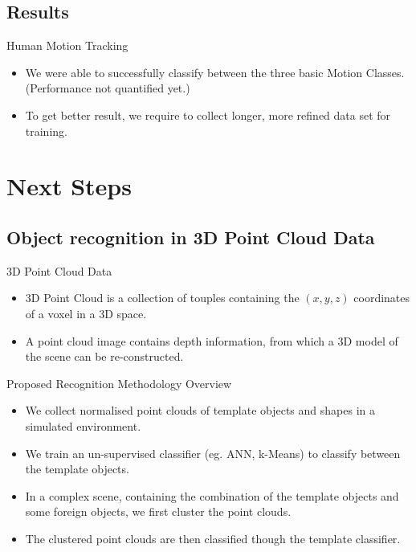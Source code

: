 \documentclass{beamer}
\begin{document}
\subsection{Results}
\begin{frame}{Human Motion Tracking}
    \begin{itemize}
    \item {
      We were able to successfully classify between the three basic Motion Classes. (Performance not quantified yet.)
    }
    \item {
      To get better result, we require to collect longer, more refined data set for training.
    }
    \end{itemize}
\end{frame}

\section{Next Steps}
\subsection{Object recognition in 3D Point Cloud Data}
\begin{frame}{3D Point Cloud Data}
  \begin{itemize}
  \item {
    3D Point Cloud is a collection of touples containing the $(x, y, z)$ coordinates of a voxel in a 3D space.
  }
  \item {
    A point cloud image contains depth information, from which a 3D model of the scene can be re-constructed.
  }
  \end{itemize}
\end{frame}
\begin{frame}{Proposed Recognition Methodology Overview}
  \begin{itemize}
  \item {
    We collect normalised point clouds of template objects and shapes in a simulated environment.
  }
  \item {
    We train an un-supervised classifier (eg. ANN, k-Means) to classify between the template objects.
  }
  \item {
    In a complex scene, containing the combination of the template objects and some foreign objects, we first cluster the point clouds.
  }
  \item {
    The clustered point clouds are then classified though the template classifier.
  }
  \end{itemize}
\end{frame}
\end{document}
